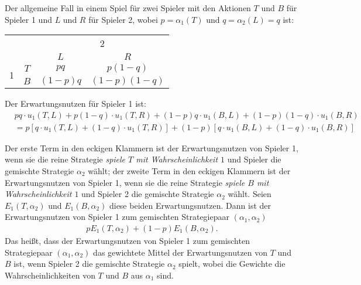 Der allgemeine Fall in einem Spiel für zwei Spieler mit den Aktionen $T$ und $B$ für
Spieler 1 und $L$ und $R$ für Spieler 2, wobei $p = α_1(T)$ und $q = α_2(L) = q$ ist:
\begin{center}
  \begin{tabular}{cccc}
    & & \multicolumn{2}{c}{2}\\
    & & $L$ & $R$\\
    \cmidrule{2-3}
    \multirow{2}{*}{1}
      & $T$ & $pq$ & $p(1-q)$\\
    \cmidrule{2-3}
      & $B$ & $(1-p)q$ & $(1-p)(1-q)$\\
    \cmidrule{2-3}
  \end{tabular}
\end{center}

Der Erwartungsnutzen für Spieler 1 ist:
\begin{align*}
  & pq \cdot u_1(T,L)
  + p(1-q) \cdot u_1(T,R)
  + (1-p)q \cdot u_1(B,L)
  + (1-p)(1-q) \cdot u_1(B,R)\\
  & =
    p     \left[ q \cdot u_1(T,L) + (1-q) \cdot u_1(T,R) \right]
  + (1-p) \left[ q \cdot u_1(B,L) + (1-q) \cdot u_1(B,R) \right]
\end{align*}

Der erste Term in den eckigen Klammern ist der Erwartungsnutzen von Spieler 1,
wenn sie die reine Strategie \emph{spiele $T$ mit Wahrscheinlichkeit $1$}
und Spieler die gemischte Strategie $α_2$ wählt;
der zweite Term in den eckigen Klammern ist der Erwartungsnutzen von Spieler 1,
wenn sie die reine Strategie \emph{spiele $B$ mit Wahrscheinlichkeit $1$}
und Spieler 2 die gemischte Strategie $α_2$ wählt.
Seien $E_1(T, α_2)$ und $E_1(B, α_2)$ diese beiden Erwartungsnutzen.
Dann ist der Erwartungsnutzen von Spieler 1 zum gemischten Strategiepaar $(α_1, α_2)$
\begin{align*}
  p E_1(T, α_2) + (1-p) E_1(B, α_2).
\end{align*}
Das heißt, dass der Erwartungsnutzen von Spieler 1 zum gemischten Strategiepaar
$(α_1, α_2)$ das gewichtete Mittel der Erwartungsnutzen von $T$ und $B$ ist,
wenn Spieler 2 die gemischte Strategie $α_2$ spielt,
wobei die Gewichte die Wahrscheinlichkeiten von $T$ und $B$ aus $α_1$ sind.

